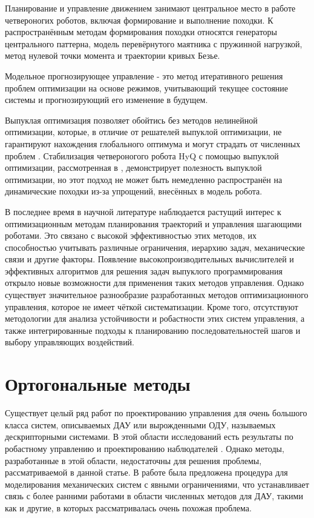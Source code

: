 Планирование и управление движением занимают центральное место в работе четвероногих роботов, включая формирование и выполнение походки.  К распространённым методам формирования походки относятся генераторы центрального паттерна, модель перевёрнутого маятника с пружинной нагрузкой, метод нулевой точки момента и траектории кривых Безье.

Модельное прогнозирующее управление - это метод итеративного решения проблем оптимизации на основе режимов, учитывающий текущее состояние системы и прогнозирующий его изменение в будущем.

Выпуклая оптимизация позволяет обойтись без методов нелинейной оптимизации, которые, в отличие от решателей выпуклой оптимизации, не гарантируют нахождения глобального оптимума и могут страдать от численных проблем \cite{boyd2004convex}. Стабилизация четвероногого робота HyQ с помощью выпуклой оптимизации, рассмотренная в \cite{Focchi2016}, демонстрирует полезность выпуклой оптимизации, но этот подход не может быть немедленно распространён на динамические походки из-за  упрощений, внесённых в модель робота.

В последнее время в научной литературе наблюдается растущий интерес к оптимизационным методам планирования траекторий и управления шагающими роботами. Это связано с высокой эффективностью этих методов, их способностью учитывать различные ограничения, иерархию задач, механические связи и другие факторы. Появление высокопроизводительных вычислителей и эффективных алгоритмов для решения задач выпуклого программирования открыло новые возможности для применения таких методов управления. Однако существует значительное разнообразие разработанных методов оптимизационного управления, которое не имеет чёткой систематизации. Кроме того, отсутствуют методологии для анализа устойчивости и робастности этих систем управления, а также интегрированные подходы к планированию последовательностей шагов и выбору управляющих воздействий.

\section{Ортогональные методы}\label{sec:ch1/sec3}

Существует целый ряд работ по проектированию управления для очень большого класса систем, описываемых ДАУ или вырожденными ОДУ, называемых дескрипторными системами. В этой области исследований есть результаты по робастному управлению и проектированию наблюдателей \cite{Cheng2018, Darouach2014}. Однако методы, разработанные в этой области, недостаточны для решения проблемы, рассматриваемой в данной статье. В работе \cite{Aghili2003} была предложена процедура для моделирования механических систем с явными ограничениями, что устанавливает связь с более ранними работами в области численных методов для ДАУ, такими как \cite{Liang1987} и другие, в которых рассматривалась очень похожая проблема. 

